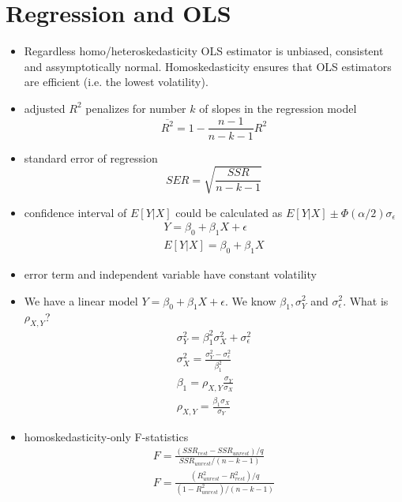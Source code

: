 \section{Regression and OLS}

\begin{itemize}
\item Regardless homo/heteroskedasticity OLS estimator is unbiased, consistent and assymptotically normal. Homoskedasticity ensures that OLS estimators are efficient (i.e. the lowest volatility).
\item adjusted $R^2$ penalizes for number $k$ of slopes in the regression model
\begin{equation*}
\overline{R^2} = 1 - \frac{n - 1}{n - k - 1}R^2
\end{equation*}
\item standard error of regression
\begin{equation*}
SER = \sqrt{\frac{SSR}{n - k -1}}
\end{equation*}
\item confidence interval of $E[Y|X]$ could be calculated as $E[Y|X] \pm \Phi(\alpha/2)\sigma_{\epsilon}$
\begin{gather*}
Y = \beta_0 + \beta_1 X + \epsilon\\
E[Y|X] = \beta_0 + \beta_1 X
\end{gather*}
\item error term and independent variable have constant volatility
\item We have a linear model $Y = \beta_0 + \beta_1 X + \epsilon$. We know $\beta_1, \sigma^2_Y$ and $\sigma^2_{\epsilon}$. What is $\rho_{X,Y}$?
\begin{gather*}
\sigma_Y^2 = \beta_1^2 \sigma_X^2 + \sigma_{\epsilon}^2\\
\sigma_X^2 = \frac{\sigma_Y^2 - \sigma_{\epsilon}^2}{\beta_1^2}\\
\beta_1 = \rho_{X,Y} \frac{\sigma_Y}{\sigma_X}\\
\rho_{X,Y} = \frac{\beta_1 \sigma_X}{\sigma_Y}
\end{gather*}
\item homoskedasticity-only F-statistics
\begin{gather*}
F = \frac{(SSR_{rest} - SSR_{unrest}) / q}{SSR_{unrest} / (n - k - 1)}\\
F = \frac{(R^2_{unrest} - R^2_{rest}) / q}{(1 - R^2_{unrest}) / (n - k - 1)}
\end{gather*}
\end{itemize}

